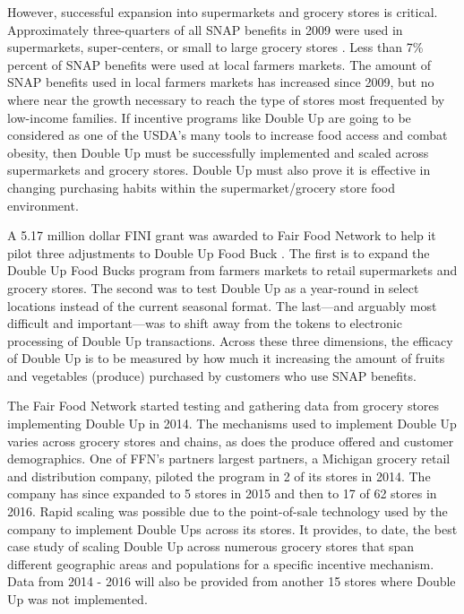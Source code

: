 \documentclass[11pt,letterpaperpaper,]{book}
\begin{document}
However, successful expansion into supermarkets and grocery stores is
critical. Approximately three-quarters of all SNAP benefits in 2009 were
used in supermarkets, super-centers, or small to large grocery stores
\citep{castner_benefit_2011}. Less than 7\% percent of SNAP benefits
were used at local farmers markets. The amount of SNAP benefits used in
local farmers markets has increased since 2009, but no where near the
growth necessary to reach the type of stores most frequented by
low-income families. If incentive programs like Double Up are going to
be considered as one of the USDA's many tools to increase food access
and combat obesity, then Double Up must be successfully implemented and
scaled across supermarkets and grocery stores. Double Up must also prove
it is effective in changing purchasing habits within the
supermarket/grocery store food environment.

A 5.17 million dollar FINI grant was awarded to Fair Food Network to
help it pilot three adjustments to Double Up Food Buck
\citep{usda_nifa_usda_2015}. The first is to expand the Double Up Food
Bucks program from farmers markets to retail supermarkets and grocery
stores. The second was to test Double Up as a year-round in select
locations instead of the current seasonal format. The last---and
arguably most difficult and important---was to shift away from the
tokens to electronic processing of Double Up transactions. Across these
three dimensions, the efficacy of Double Up is to be measured by how
much it increasing the amount of fruits and vegetables (produce)
purchased by customers who use SNAP benefits.

The Fair Food Network started testing and gathering data from grocery
stores implementing Double Up in 2014. The mechanisms used to implement
Double Up varies across grocery stores and chains, as does the produce
offered and customer demographics. One of FFN's partners largest
partners, a Michigan grocery retail and distribution company, piloted
the program in 2 of its stores in 2014. The company has since expanded
to 5 stores in 2015 and then to 17 of 62 stores in 2016. Rapid scaling
was possible due to the point-of-sale technology used by the company to
implement Double Ups across its stores. It provides, to date, the best
case study of scaling Double Up across numerous grocery stores that span
different geographic areas and populations for a specific incentive
mechanism. Data from 2014 - 2016 will also be provided from another 15
stores where Double Up was not implemented.
\end{document}
